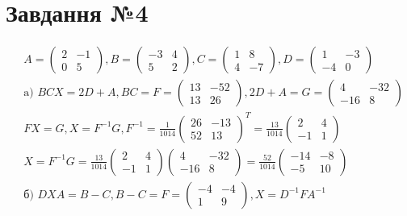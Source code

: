 \documentclass{report}
\begin{document}
\section{Завдання №4}
\begin{equation}\label{eq4}\begin{split}
	& A =\begin{pmatrix}2 & -1\\0 & 5\end{pmatrix}, B =\begin{pmatrix}-3 & 4\\5 & 2\end{pmatrix}, C =\begin{pmatrix}1 & 8\\4 & -7\end{pmatrix}, D =\begin{pmatrix}1 & -3\\-4 & 0\end{pmatrix} \\
	& \mbox{a) }BCX = 2D + A, BC = F = \begin{pmatrix}13 & -52\\13 & 26\end{pmatrix}, 2D + A = G = \begin{pmatrix}4 & -32\\-16 & 8\end{pmatrix}  \\
& FX = G, X = F^{-1}G, F^{-1} = \frac{1}{1014}\begin{pmatrix}26 & -13\\52 & 13\end{pmatrix}^{T} = \frac{13}{1014}\begin{pmatrix}2 & 4\\-1 & 1\end{pmatrix} \\
& X = F^{-1}G = \frac{13}{1014}\begin{pmatrix}2 & 4\\-1 & 1\end{pmatrix}\begin{pmatrix}4 & -32\\-16 & 8\end{pmatrix} = \frac{52}{1014}\begin{pmatrix}-14 & -8\\-5 & 10\end{pmatrix} \\
	& \mbox{б) }DXA=B-C, B-C=F=\begin{pmatrix}-4 & -4\\1 & 9\end{pmatrix}, X = D^{-1}FA^{-1} \\

\end{split}
\end{equation}
\end{document}
